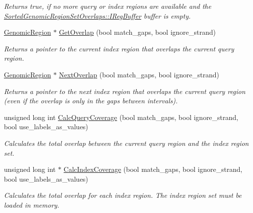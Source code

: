 \begin{CompactItemize}
\begin{CompactList}\small\item\em Returns true, if no more query or index regions are available and the \hyperlink{classSortedGenomicRegionSetOverlaps_19fa18e6abd9f045786698fff48a445f}{SortedGenomicRegionSetOverlaps::IRegBuffer} buffer is empty. \item\end{CompactList}\item 
\hyperlink{classGenomicRegion}{GenomicRegion} $\ast$ \hyperlink{classGenomicRegionSetOverlaps_46c3193d39eb61430b0267ca301b226e}{GetOverlap} (bool match\_\-gaps, bool ignore\_\-strand)
\begin{CompactList}\small\item\em Returns a pointer to the current index region that overlaps the current query region. \item\end{CompactList}\item 
\hyperlink{classGenomicRegion}{GenomicRegion} $\ast$ \hyperlink{classGenomicRegionSetOverlaps_2fa112eab38f07e7bc75ac76f5b9fc67}{NextOverlap} (bool match\_\-gaps, bool ignore\_\-strand)
\begin{CompactList}\small\item\em Returns a pointer to the next index region that overlaps the current query region (even if the overlap is only in the gaps between intervals). \item\end{CompactList}\item 
unsigned long int \hyperlink{classGenomicRegionSetOverlaps_1e30ae0e49423a432b7a1d3e3ff09011}{CalcQueryCoverage} (bool match\_\-gaps, bool ignore\_\-strand, bool use\_\-labels\_\-as\_\-values)
\begin{CompactList}\small\item\em Calculates the total overlap between the current query region and the index region set. \item\end{CompactList}\item 
unsigned long int $\ast$ \hyperlink{classGenomicRegionSetOverlaps_5c31081b154c624ba35487d988082ffa}{CalcIndexCoverage} (bool match\_\-gaps, bool ignore\_\-strand, bool use\_\-labels\_\-as\_\-values)
\begin{CompactList}\small\item\em Calculates the total overlap for each index region. The index region set must be loaded in memory. \item\end{CompactList}\item 

\end{CompactItemize}
